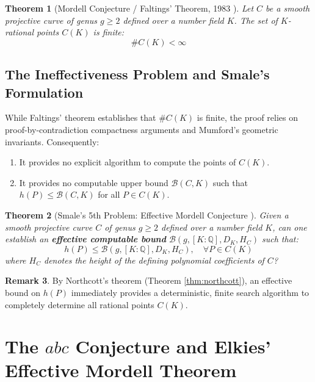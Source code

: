\documentclass[11pt,a4paper]{article}
\newtheorem{theorem}{Theorem}[section]
\theoremstyle{definition}
\newtheorem{remark}[theorem]{Remark}
\begin{document}
\begin{theorem}[Mordell Conjecture / Faltings' Theorem, 1983 \cite{faltings1983}]\label{thm:faltings}
Let $C$ be a smooth projective curve of genus $g \ge 2$ defined over a number field $K$. The set of $K$-rational points $C(K)$ is finite:
\begin{equation}\label{eq:finiteness_ck}
\# C(K) < \infty
\end{equation}
\end{theorem}

\subsection{The Ineffectiveness Problem and Smale's Formulation}
While Faltings' theorem establishes that $\# C(K)$ is finite, the proof relies on proof-by-contradiction compactness arguments and Mumford's geometric invariants. Consequently:
\begin{enumerate}
    \item It provides no explicit algorithm to compute the points of $C(K)$.
    \item It provides no computable upper bound $\mathcal{B}(C, K)$ such that $h(P) \le \mathcal{B}(C, K)$ for all $P \in C(K)$.
\end{enumerate}

\begin{theorem}[Smale's 5th Problem: Effective Mordell Conjecture \cite{smale2000}]\label{thm:smale_5}
Given a smooth projective curve $C$ of genus $g \ge 2$ defined over a number field $K$, can one establish an \textbf{effective computable bound} $\mathcal{B}(g, [K:\mathbb{Q}], D_K, H_C)$ such that:
\begin{equation}\label{eq:effective_bound}
h(P) \le \mathcal{B}(g, [K:\mathbb{Q}], D_K, H_C), \quad \forall P \in C(K)
\end{equation}
where $H_C$ denotes the height of the defining polynomial coefficients of $C$?
\end{theorem}

\begin{remark}
By Northcott's theorem (Theorem \ref{thm:northcott}), an effective bound on $h(P)$ immediately provides a deterministic, finite search algorithm to completely determine all rational points $C(K)$.
\end{remark}

\section{The $abc$ Conjecture and Elkies' Effective Mordell Theorem}
\end{document}
